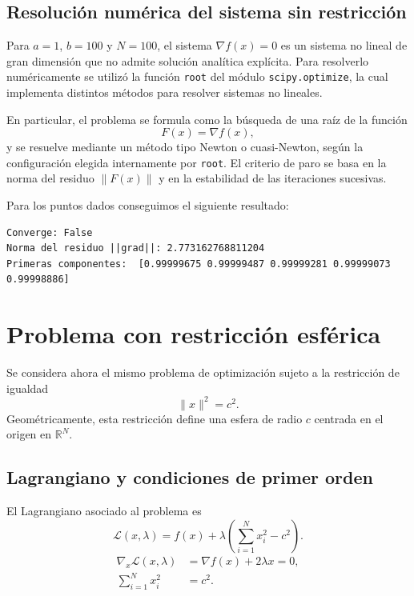 \documentclass[11pt,a4paper]{article}
\begin{document}
\subsection{Resolución numérica del sistema sin restricción}

Para \(a=1\), \(b=100\) y \(N=100\), el sistema \(\nabla f(x)=0\) es un sistema no lineal de gran dimensión que no admite solución analítica explícita. Para resolverlo numéricamente se utilizó la función \texttt{root} del módulo \texttt{scipy.optimize}, la cual implementa distintos métodos para resolver sistemas no lineales.

En particular, el problema se formula como la búsqueda de una raíz de la función
\[
F(x)=\nabla f(x),
\]
y se resuelve mediante un método tipo Newton o cuasi-Newton, según la configuración elegida internamente por \texttt{root}. El criterio de paro se basa en la norma del residuo \(\|F(x)\|\) y en la estabilidad de las iteraciones sucesivas.

Para los puntos dados conseguimos el siguiente resultado:
\begin{verbatim}
Converge: False
Norma del residuo ||grad||: 2.773162768811204
Primeras componentes:  [0.99999675 0.99999487 0.99999281 0.99999073 0.99998886]
\end{verbatim}
\section{Problema con restricción esférica}

Se considera ahora el mismo problema de optimización sujeto a la restricción de igualdad
\begin{equation}
\|x\|^2=c^2.
\end{equation}
Geométricamente, esta restricción define una esfera de radio \(c\) centrada en el origen en \(\mathbb{R}^N\).

\subsection{Lagrangiano y condiciones de primer orden}

El Lagrangiano asociado al problema es
\begin{equation}
\mathcal{L}(x,\lambda)
=f(x)+\lambda\left(\sum_{i=1}^N x_i^2-c^2\right).
\end{equation}
\begin{align}
\nabla_x \mathcal{L}(x,\lambda)
&=\nabla f(x)+2\lambda x=0,\\
\sum_{i=1}^N x_i^2&=c^2.
\end{align}
\end{document}
